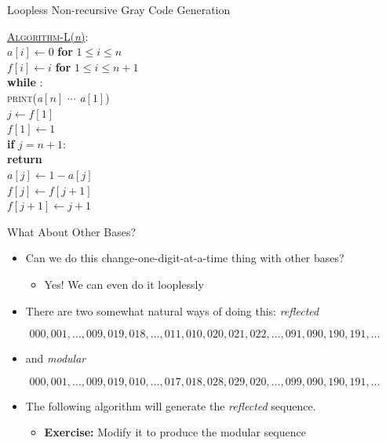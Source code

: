 \documentclass[aspectratio=169]{beamer}
\begin{document}
\begin{frame}{Loopless Non-recursive Gray Code Generation}
    \begin{nalgo}
    \underline{\textsc{Algorithm-L}(\emph{n})}:\+
    \\\label{}  $a[i] \gets 0$ \textbf{for} $1 \leq i \leq n$
    \\\label{}  $f[i] \gets i$ \textbf{for} $1 \leq i \leq n + 1$
    \\\label{}  \textbf{while} \true:\+
    \\\label{}      \textsc{print}(\emph{a}$[n]$ $\cdots$ \emph{a}$[1]$)
    \\\label{}      $j \gets f[1]$
    \\\label{}      $f[1] \gets 1$
    \\\label{}      \textbf{if} $j = n + 1$:\+
    \\\label{}          \textbf{return}\-
    \\\label{}      $a[j] \gets 1 - a[j]$
    \\\label{}      $f[j] \gets f[j + 1]$
    \\\label{}      $f[j + 1] \gets j + 1$
    \end{nalgo}
\end{frame}

\begin{frame}{What About Other Bases?}
    \begin{itemize}
        \item Can we do this change-one-digit-at-a-time thing with other bases? \pause
        \begin{itemize}
            \item Yes! We can even do it looplessly
        \end{itemize} \pause
        \item There are two somewhat natural ways of doing this: \emph{reflected}
    \end{itemize}
    \[
        000, 001, \ldots, 009, 019, 018, \ldots, 011, 010, 020, 021, 022, \ldots, 091, 090, 190, 191, \ldots
    \]\pause
    \begin{itemize}
        \item and \emph{modular}
    \end{itemize}
    \[
        000, 001, \ldots, 009, 019, 010, \ldots, 017, 018, 028, 029, 020, \ldots, 099, 090, 190, 191, \ldots
    \] \pause
    \begin{itemize}
        \item The following algorithm will generate the \emph{reflected} sequence.
        \begin{itemize}
            \item \textcolor{sigma@alertred}{\textbf{Exercise:}} Modify it to produce the modular sequence
        \end{itemize}
    \end{itemize}
\end{frame}
\end{document}
